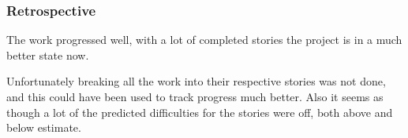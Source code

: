 \subsubsection{Retrospective}
The work progressed well, with a lot of completed stories the project is in a much better state now.

Unfortunately breaking all the work into their respective stories was not done, and this could have been used to track progress much better. Also it seems as though a lot of the predicted difficulties for the stories were off, both above and below estimate.
\newpage
